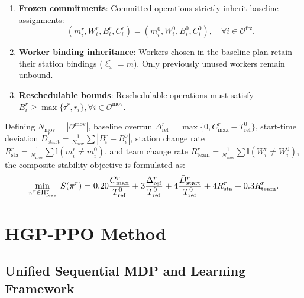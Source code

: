 \documentclass[journal,10pt]{IEEEtran}
\begin{document}
\begin{enumerate}
\item \textbf{Frozen commitments}: Committed operations strictly inherit baseline assignments:
\begin{equation}
(m_i^r, W_i^r, B_i^r, C_i^r) = (m_i^0, W_i^0, B_i^0, C_i^0), \quad \forall i\in\mathcal{O}^{\mathrm{frz}}.
\end{equation}
\item \textbf{Worker binding inheritance}: Workers chosen in the baseline plan retain their station bindings ($\ell_w^r=m$). Only previously unused workers remain unbound.
\item \textbf{Reschedulable bounds}: Reschedulable operations must satisfy $B_i^r \ge \max\{\tau^r, r_i\}, \forall i\in\mathcal{O}^{\mathrm{mov}}$.
\end{enumerate}

Defining $N_{\mathrm{mov}}=|\mathcal{O}^{\mathrm{mov}}|$, baseline overrun $\Delta_{\mathrm{ref}}^r=\max\{0, C_{\max}^r-T_{\mathrm{ref}}^0\}$, start-time deviation $\bar D_{\mathrm{start}}^r=\frac{1}{N_{\mathrm{mov}}}\sum |B_i^r-B_i^0|$, station change rate $R_{\mathrm{sta}}^r=\frac{1}{N_{\mathrm{mov}}}\sum \mathbb{I}(m_i^r\ne m_i^0)$, and team change rate $R_{\mathrm{team}}^r=\frac{1}{N_{\mathrm{mov}}}\sum \mathbb{I}(W_i^r\ne W_i^0)$, the composite stability objective is formulated as:
\begin{equation}\label{eq:reschedule_obj}
\resizebox{0.88\linewidth}{!}{$\displaystyle
\min_{\pi^r\in\Pi_{\mathrm{feas}}^r}\; S(\pi^r) = 0.20\frac{C_{\max}^r}{T_{\mathrm{ref}}^0} + 3\frac{\Delta_{\mathrm{ref}}^r}{T_{\mathrm{ref}}^0} + 4\frac{\bar D_{\mathrm{start}}^r}{T_{\mathrm{ref}}^0} + 4 R_{\mathrm{sta}}^r + 0.3 R_{\mathrm{team}}^r.
$}
\end{equation}

\section{HGP-PPO Method}\label{sec:method}

\subsection{Unified Sequential MDP and Learning Framework}
\end{document}

